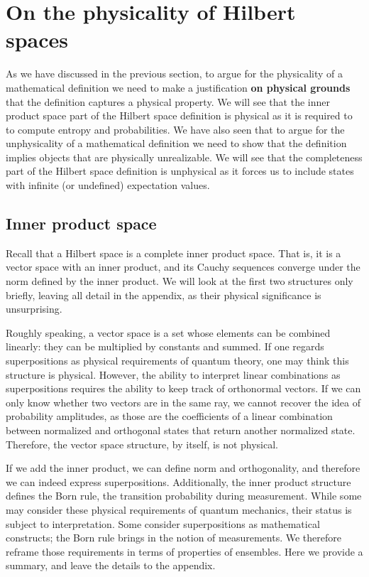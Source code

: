\documentclass[10pt,twocolumn, nofootinbib]{revtex4-2}
\begin{document}
\section{On the physicality of Hilbert spaces}

As we have discussed in the previous section, to argue for the physicality of a mathematical definition we need to make a justification \textbf{on physical grounds} that the definition captures a physical property.  We will see that the inner product space part of the Hilbert space definition is physical as it is required to to compute entropy and probabilities. We have also seen that to argue for the unphysicality of a mathematical definition we need to show that the definition implies objects that are physically unrealizable. We will see that the completeness part of the Hilbert space definition is unphysical as it forces us to include states with infinite (or undefined) expectation values.

\subsection{Inner product space}

Recall that a Hilbert space is a complete inner product space. That is, it is a vector space with an inner product, and its Cauchy sequences converge under the norm defined by the inner product. We will look at the first two structures only briefly, leaving all detail in the appendix, as their physical significance is unsurprising.

Roughly speaking, a vector space is a set whose elements can be combined linearly: they can be multiplied by constants and summed. If one regards superpositions as physical requirements of quantum theory, one may think this structure is physical. However, the ability to interpret linear combinations as superpositions requires the ability to keep track of orthonormal vectors. If we can only know whether two vectors are in the same ray, we cannot recover the idea of probability amplitudes, as those are the coefficients of a linear combination between normalized and orthogonal states that return another normalized state. Therefore, the vector space structure, by itself, is not physical.

If we add the inner product, we can define norm and orthogonality, and therefore we can indeed express superpositions. Additionally, the inner product structure defines the Born rule, the transition probability during measurement. While some may consider these physical requirements of quantum mechanics, their status is subject to interpretation.\cite{albert_quantum_1994, wallace_everett_2013, howard_complementarity_2021, ghirardi_unified_1986} Some consider superpositions as mathematical constructs; the Born rule brings in the notion of measurements. We therefore reframe those requirements in terms of properties of ensembles. Here we provide a summary, and leave the details to the appendix.
\end{document}

